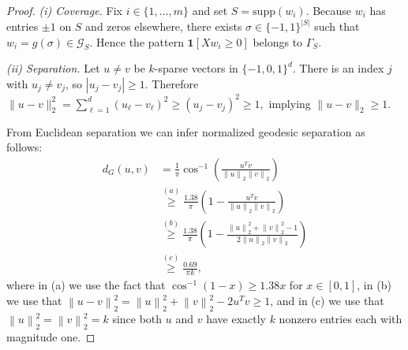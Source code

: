 \documentclass{article} %
\newcommand{\twonorm}[1]{\left\|#1\right\|_{2}}
\newcommand{\1}{\ensuremath{{\sf (i)}}}
\newcommand{\2}{\ensuremath{{\sf (ii)}}}
\newcommand{\3}{\ensuremath{{\sf (iii)}}}
\newcommand{\4}{\ensuremath{{\sf (iv)}}}
\newcommand{\5}{\ensuremath{{\sf (v)}}}
\newcommand{\6}{\ensuremath{{\sf (vi)}}}
\begin{document}
\begin{proof}
\textit{(i) Coverage.}
Fix \(i\in\{1,\dots ,m\}\) and set \(S=\text{supp}(w_{i})\).
Because \(w_{i}\) has entries \(\pm1\) on \(S\) and zeros elsewhere,
there exists \(\sigma\in\{-1,1\}^{|S|}\) such that \(w_{i}=g(\sigma)\in\mathcal G_{S}\).
Hence the pattern \(\mathbf 1[Xw_{i}\ge 0]\) belongs to
\(\Gamma_{S}\). 


\medskip
\noindent
\textit{(ii) Separation.}
Let \(u\neq v\) be \(k\)-sparse vectors in \(\{-1,0,1\}^{d}\).
There is an index \(j\) with \(u_{j}\neq v_{j}\),
so \(|u_{j}-v_{j}|\ge 1\).
Therefore
\(
\lVert u-v\rVert_{2}^{2}
=\sum_{\ell=1}^{d}(u_{\ell}-v_{\ell})^{2}
\ge (u_{j}-v_{j})^{2}\ge 1,
\)
implying \(\lVert u-v\rVert_{2}\ge 1\).

From Euclidean separation we can infer normalized geodesic separation as follows:
\begin{align*}
    d_G(u, v) &= \frac{1}{\pi}\cos^{-1}\left(\frac{u^Tv}{\twonorm{u}\twonorm{v}} \right) \\
    &\overset{(a)}{\geq} \frac{1.38}{\pi}\left(1-\frac{u^Tv}{\twonorm{u}\twonorm{v}} \right) \\
    &\overset{(b)}{\geq} \frac{1.38}{\pi}\left(1-\frac{\twonorm{u}^2 + \twonorm{v}^2 - 1}{2\twonorm{u}\twonorm{v}} \right) \\
    &\overset{(c)}{\geq} \frac{0.69}{\pi k}  ,
\end{align*}
where in (a) we use the fact that $\cos^{-1}(1-x) \geq 1.38x$ for $x \in [0,1]$, in (b) we use that $\twonorm{u-v}^2 = \twonorm{u}^2 + \twonorm{v}^2 - 2u^Tv \geq 1$, and in (c) we use that $\twonorm{u}^2 = \twonorm{v}^2 = k$ since both $u$ and $v$ have exactly $k$ nonzero entries each with magnitude one.
\end{proof}
\end{document}
